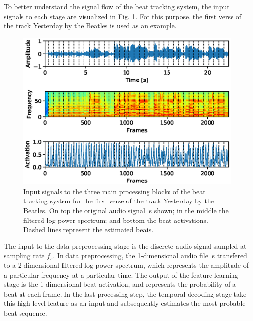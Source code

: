 \documentclass{scrartcl}
\begin{document}
To better understand the signal flow of the beat tracking system, the input signals to each stage are visualized in Fig. \ref{fig:pipeline}. For this purpose, the first verse of the track Yesterday by the Beatles is used as an example.
\begin{figure}[htbp]
\centering
\includegraphics[scale=0.82,trim={0.4cm 0.4cm 0cm 0.2cm},clip]{figures/pipeline.eps}
\caption{Input signals to the three main processing blocks of the beat tracking system for the first verse of the track Yesterday by the Beatles. On top the original audio signal is shown; in the middle the filtered log power spectrum; and bottom the beat activations. Dashed lines represent the estimated beats.}
\label{fig:pipeline}
\end{figure}
The input to the data preprocessing stage is the discrete audio signal sampled at sampling rate $f_s$. In data preprocessing, the 1-dimensional audio file is transfered to a 2-dimensional filtered log power spectrum, which represents the amplitude of a particular frequency at a particular time. The output of the feature learning stage is the 1-dimensional beat activation, and represents the probability of a beat at each frame. In the last processing step, the temporal decoding stage take this high-level feature as an input and subsequently estimates the most probable beat sequence.
\end{document}
